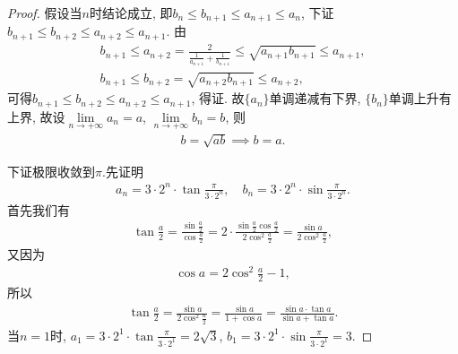 \documentclass[../../main.tex]{subfiles}%
\begin{document}
\begin{proof}
假设当$n$时结论成立, 即$b_n \leqslant b_{n+1} \leqslant a_{n+1} \leqslant a_n$, 下证$b_{n+1} \leqslant b_{n+2} \leqslant a_{n+2} \leqslant a_{n+1}$.
由
\begin{gather*}
b_{n+1} \leqslant a_{n+2} = \frac{2}{\frac{1}{a_{n+1}} + \frac{1}{b_{n+1}}} \leqslant \sqrt{a_{n+1} b_{n+1}} \leqslant a_{n+1}, \\
b_{n+1} \leqslant b_{n+2} = \sqrt{a_{n+2} b_{n+1}} \leqslant a_{n+2},
\end{gather*}
可得$b_{n+1} \leqslant b_{n+2} \leqslant a_{n+2} \leqslant a_{n+1}$, 得证.
故$\{a_n\}$单调递减有下界, $\{b_n\}$单调上升有上界, 故设$\lim\limits_{n \to +\infty} a_n = a$, $\lim\limits_{n \to +\infty} b_n = b$, 则
\begin{align*}
b = \sqrt{ab} \implies b = a.
\end{align*}

下证极限收敛到$\pi$.先证明
\begin{align*}
a_n=3\cdot 2^n\cdot \tan \frac{\pi}{3\cdot 2^n},\quad b_n=3\cdot 2^n\cdot \sin \frac{\pi}{3\cdot 2^n}.
\end{align*}
首先我们有
\begin{align*}
\tan \frac{a}{2} = \frac{\sin \frac{a}{2}}{\cos \frac{a}{2}} = 2 \cdot \frac{\sin \frac{a}{2} \cos \frac{a}{2}}{2 \cos^2 \frac{a}{2}} = \frac{\sin a}{2 \cos^2 \frac{a}{2}},
\end{align*}
又因为
\begin{align*}
\cos a = 2 \cos^2 \frac{a}{2} - 1,
\end{align*}
所以
\begin{align*}
\tan \frac{a}{2} = \frac{\sin a}{2 \cos^2 \frac{a}{2}} = \frac{\sin a}{1 + \cos a} = \frac{\sin a \cdot \tan a}{\sin a + \tan a}.
\end{align*}
当$n = 1$时, $a_1 = 3 \cdot 2^1 \cdot \tan \frac{\pi}{3 \cdot 2^1} = 2\sqrt{3}$, $b_1 = 3 \cdot 2^1 \cdot \sin \frac{\pi}{3 \cdot 2^1} = 3$.


\end{proof}
\end{document}
